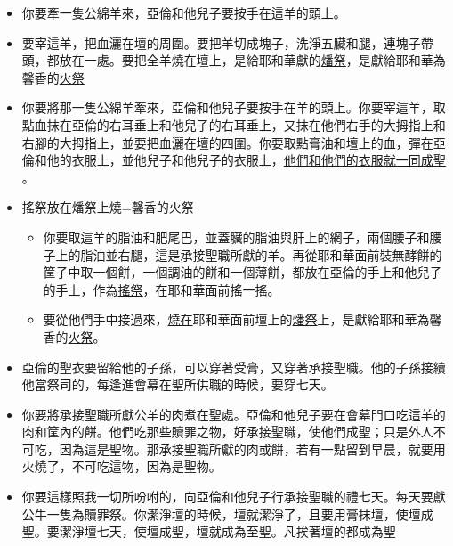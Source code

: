 \begin{table}
\begin{itemize} 
\itemsep-.35em
\item 你要牽一隻公綿羊來，亞倫和他兒子要按手在這羊的頭上。 
\item 要宰這羊，把血灑在壇的周圍。要把羊切成塊子，洗淨五臟和腿，連塊子帶頭，都放在一處。要把全羊燒在壇上，是給耶和華獻的\underline{燔祭}，是獻給耶和華為馨香的\underline{火祭}
\end{itemize}

\begin{itemize} 
\itemsep-.35em
\item 你要將那一隻公綿羊牽來，亞倫和他兒子要按手在羊的頭上。你要宰這羊，取點血抹在亞倫的右耳垂上和他兒子的右耳垂上，又抹在他們右手的大拇指上和右腳的大拇指上，並要把血灑在壇的四圍。你要取點膏油和壇上的血，彈在亞倫和他的衣服上，並他兒子和他兒子的衣服上，\underline{他們和他們的衣服就一同成聖} 。 
\item 搖祭放在燔祭上燒=馨香的火祭
\begin{itemize} 
\itemsep-.35em
\item 你要取這羊的脂油和肥尾巴，並蓋臟的脂油與肝上的網子，兩個腰子和腰子上的脂油並右腿，這是承接聖職所獻的羊。再從耶和華面前裝無酵餅的筐子中取一個餅，一個調油的餅和一個薄餅，都放在亞倫的手上和他兒子的手上，作為\underline{搖祭}，在耶和華面前搖一搖。
\item 要從他們手中接過來，\underline{燒在}耶和華面前壇上的\underline{燔祭}上，是獻給耶和華為馨香的\underline{火祭}。
\end{itemize}
\end{itemize}

\begin{itemize} 
\itemsep-.35em
\item 亞倫的聖衣要留給他的子孫，可以穿著受膏，又穿著承接聖職。他的子孫接續他當祭司的，每逢進會幕在聖所供職的時候，要穿七天。
\item 你要將承接聖職所獻公羊的肉煮在聖處。亞倫和他兒子要在會幕門口吃這羊的肉和筐內的餅。他們吃那些贖罪之物，好承接聖職，使他們成聖；只是外人不可吃，因為這是聖物。那承接聖職所獻的肉或餅，若有一點留到早晨，就要用火燒了，不可吃這物，因為是聖物。
\item 你要這樣照我一切所吩咐的，向亞倫和他兒子行承接聖職的禮七天。每天要獻公牛一隻為贖罪祭。你潔淨壇的時候，壇就潔淨了，且要用膏抹壇，使壇成聖。要潔淨壇七天，使壇成聖，壇就成為至聖。凡挨著壇的都成為聖
\end{itemize}



\end{table}

